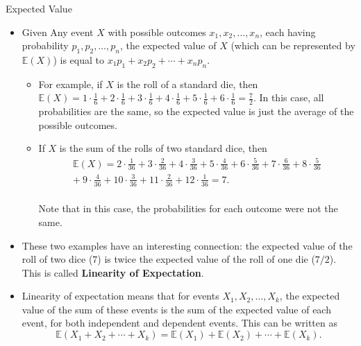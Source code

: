 \documentclass[9pt]{beamer}
\begin{document}
\begin{frame}[fragile, t]{Expected Value}
    \begin{itemize}
        \item Given Any event $X$ with possible outcomes $x_1,x_2,\ldots,x_n$, each having probability $p_1,p_2,\ldots,p_n$, the expected value of $X$ (which can be represented by $\mathbb{E}(X)$) is equal to $x_1p_1+x_2p_2+\cdots+x_np_n$.
        \begin{itemize}
            \item For example, if $X$ is the roll of a standard die, then $\mathbb{E}(X)=1\cdot\frac{1}{6}+2\cdot\frac{1}{6}+3\cdot\frac{1}{6}+4\cdot\frac{1}{6}+5\cdot\frac{1}{6}+6\cdot\frac{1}{6}=\frac{7}{2}$. In this case, all probabilities are the same, so the expected value is just the average of the possible outcomes.
            \item If $X$ is the sum of the rolls of two standard dice, then
            \begin{gather*}
                \mathbb{E}(X)=2\cdot\frac{1}{36}+3\cdot\frac{2}{36}+4\cdot\frac{3}{36}+5\cdot\frac{4}{36}+6\cdot\frac{5}{36}+7\cdot\frac{6}{36}+8\cdot\frac{5}{36} \\ +\ 9\cdot\frac{4}{36}+10\cdot\frac{3}{36}  +11\cdot\frac{2}{36}+12\cdot\frac{1}{36}=7.
            \end{gather*}\\
            Note that in this case, the probabilities for each outcome were not the same.
                
        \end{itemize}
        \item These two examples have an interesting connection: the expected value of the roll of two dice ($7$) is twice the expected value of the roll of one die ($7/2$). This is called \textbf{Linearity of Expectation}. 
        \item Linearity of expectation means that for events $X_1,X_2,\ldots,X_k$, the expected value of the sum of these events is the sum of the expected value of each event, for both independent and dependent events. This can be written as
        $$\mathbb{E}(X_1+X_2+\cdots+X_k)=\mathbb{E}(X_1)+\mathbb{E}(X_2)+\cdots+\mathbb{E}(X_k).$$
    \end{itemize}
    
    
\end{frame}
\end{document}
